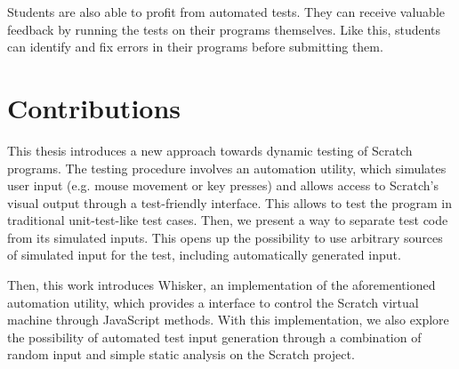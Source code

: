 Students are also able to profit from automated tests.
They can receive valuable feedback by running the tests on their programs themselves.
Like this, students can identify and fix errors in their programs before submitting them.



\section{Contributions}
This thesis introduces a new approach towards dynamic testing of Scratch programs.
The testing procedure involves an automation utility, which simulates user input (e.g. mouse movement or key presses) and allows access to Scratch's visual output through a test-friendly interface.
This allows to test the program in traditional unit-test-like test cases.
Then, we present a way to separate test code from its simulated inputs.
This opens up the possibility to use arbitrary sources of simulated input for the test, including automatically generated input.
\parspace

Then, this work introduces Whisker, an implementation of the aforementioned automation utility,
which provides a interface to control the Scratch virtual machine through JavaScript methods.
With this implementation, we also explore the possibility of automated test input generation through a combination of random input and simple static analysis on the Scratch project.
\parspace

